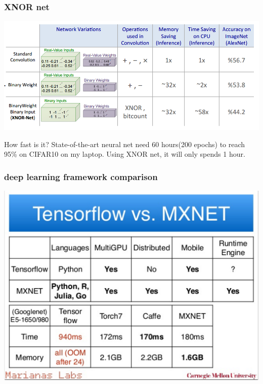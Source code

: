 \documentclass{beamer}
\begin{document}
\begin{frame}
\frametitle{XNOR net}
\includegraphics[width=\textwidth]{xnornet.png}\\
\begin{block}
{How fast is it?}
State-of-the-art neural net need 60 hours(200 epochs) to reach 95\% on CIFAR10 on my laptop. 
Using XNOR net, it will only spends 1 hour.
\end{block}
\end{frame}

\begin{frame}
\frametitle{deep learning framework comparison}
\includegraphics[width=.8\textwidth]{mxnet.png}
\end{frame}
\end{document}
